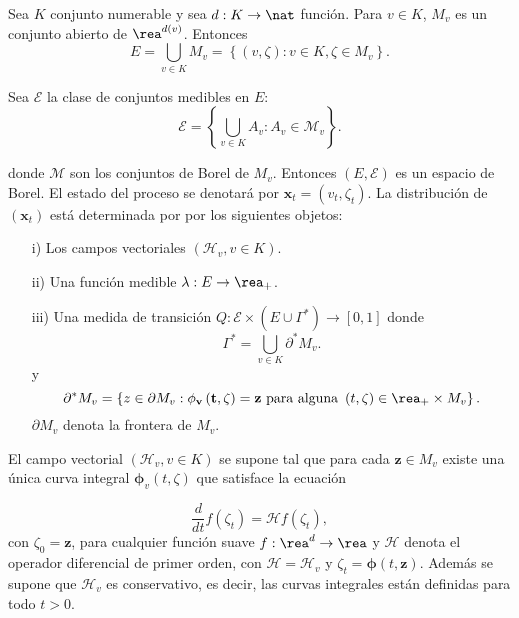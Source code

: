 Sea $K$ conjunto numerable y sea $d:K\rightarrow\nat$ funci\'on.
Para $v\in K$, $M_{v}$ es un conjunto abierto de
$\rea^{d\left(v\right)}$. Entonces \[E=\bigcup_{v\in
K}M_{v}=\left\{\left(v,\zeta\right):v\in K,\zeta\in
M_{v}\right\}.\]

Sea $\mathcal{E}$ la clase de conjuntos medibles en $E$:
\[\mathcal{E}=\left\{\bigcup_{v\in K}A_{v}:A_{v}\in \mathcal{M}_{v}\right\}.\]

donde $\mathcal{M}$ son los conjuntos de Borel de $M_{v}$.
Entonces $\left(E,\mathcal{E}\right)$ es un espacio de Borel. El
estado del proceso se denotar\'a por
$\mathbf{x}_{t}=\left(v_{t},\zeta_{t}\right)$. La distribuci\'on
de $\left(\mathbf{x}_{t}\right)$ est\'a determinada por por los
siguientes objetos:

\begin{itemize}
\item[i)] Los campos vectoriales $\left(\mathcal{H}_{v},v\in
K\right)$. \item[ii)] Una funci\'on medible $\lambda:E\rightarrow
\rea_{+}$. \item[iii)] Una medida de transici\'on
$Q:\mathcal{E}\times\left(E\cup\Gamma^{*}\right)\rightarrow\left[0,1\right]$
donde
\begin{equation}
\Gamma^{*}=\bigcup_{v\in K}\partial^{*}M_{v}.
\end{equation}
y
\begin{equation}
\partial^{*}M_{v}=\left\{z\in\partial M_{v}:\mathbf{\mathbf{\phi}_{v}\left(t,\zeta\right)=\mathbf{z}}\textrm{ para alguna }\left(t,\zeta\right)\in\rea_{+}\times M_{v}\right\}.
\end{equation}
$\partial M_{v}$ denota  la frontera de $M_{v}$.
\end{itemize}

El campo vectorial $\left(\mathcal{H}_{v},v\in K\right)$ se supone
tal que para cada $\mathbf{z}\in M_{v}$ existe una \'unica curva
integral $\mathbf{\phi}_{v}\left(t,\zeta\right)$ que satisface la
ecuaci\'on

\begin{equation}
\frac{d}{dt}f\left(\zeta_{t}\right)=\mathcal{H}f\left(\zeta_{t}\right),
\end{equation}
con $\zeta_{0}=\mathbf{z}$, para cualquier funci\'on suave
$f:\rea^{d}\rightarrow\rea$ y $\mathcal{H}$ denota el operador
diferencial de primer orden, con $\mathcal{H}=\mathcal{H}_{v}$ y
$\zeta_{t}=\mathbf{\phi}\left(t,\mathbf{z}\right)$. Adem\'as se
supone que $\mathcal{H}_{v}$ es conservativo, es decir, las curvas
integrales est\'an definidas para todo $t>0$.

